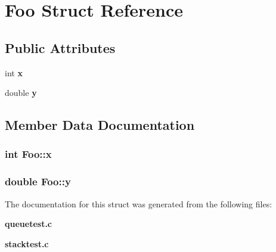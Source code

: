 \section{Foo Struct Reference}
\label{structFoo}
\subsection*{Public Attributes}
\begin{CompactItemize}
\item 
int \bf{x}
\item 
double \bf{y}
\end{CompactItemize}


\subsection{Member Data Documentation}
\subsubsection{\setlength{\rightskip}{0pt plus 5cm}int \bf{Foo::x}}\label{structFoo_d2d7f62afcf2d51be6baa7c97dec4343}


\subsubsection{\setlength{\rightskip}{0pt plus 5cm}double \bf{Foo::y}}\label{structFoo_afdfb2a64a1f2868c74a261ee3efff95}




The documentation for this struct was generated from the following files:\begin{CompactItemize}
\item 
\bf{queuetest.c}\item 
\bf{stacktest.c}\end{CompactItemize}
